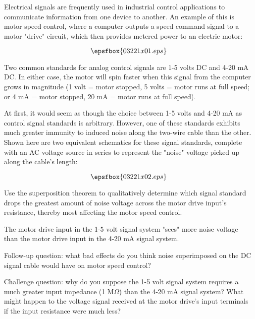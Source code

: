 

Electrical signals are frequently used in industrial control applications to communicate information from one device to another.  An example of this is motor speed control, where a computer outputs a speed command signal to a motor "drive" circuit, which then provides metered power to an electric motor:

$$\epsfbox{03221x01.eps}$$

Two common standards for analog control signals are 1-5 volts DC and 4-20 mA DC.  In either case, the motor will spin faster when this signal from the computer grows in magnitude (1 volt = motor stopped, 5 volts = motor runs at full speed; or 4 mA = motor stopped, 20 mA = motor runs at full speed).

At first, it would seem as though the choice between 1-5 volts and 4-20 mA as control signal standards is arbitrary.  However, one of these standards exhibits much greater immunity to induced noise along the two-wire cable than the other.  Shown here are two equivalent schematics for these signal standards, complete with an AC voltage source in series to represent the "noise" voltage picked up along the cable's length:

$$\epsfbox{03221x02.eps}$$

Use the superposition theorem to qualitatively determine which signal standard drops the greatest amount of noise voltage across the motor drive input's resistance, thereby most affecting the motor speed control.







The motor drive input in the 1-5 volt signal system "sees" more noise voltage than the motor drive input in the 4-20 mA signal system.

\vskip 10pt

Follow-up question: what bad effects do you think noise superimposed on the DC signal cable would have on motor speed control?

\vskip 10pt

Challenge question: why do you suppose the 1-5 volt signal system requires a much greater input impedance (1 M$\Omega$) than the 4-20 mA signal system?  What might happen to the voltage signal received at the motor drive's input terminals if the input resistance were much less?

